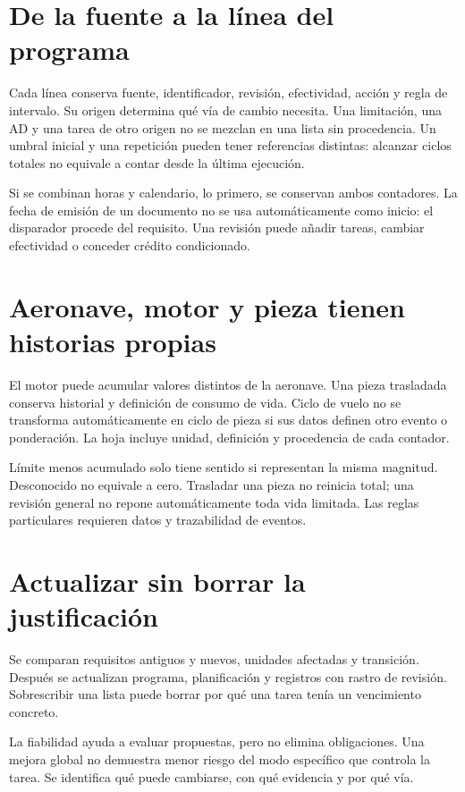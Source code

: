 
\section{De la fuente a la línea del programa}
Cada línea conserva fuente, identificador, revisión, efectividad, acción y regla de intervalo. Su origen determina qué vía de cambio necesita. Una limitación, una AD y una tarea de otro origen no se mezclan en una lista sin procedencia. Un umbral inicial y una repetición pueden tener referencias distintas: alcanzar ciclos totales no equivale a contar desde la última ejecución.

Si se combinan horas y calendario, lo primero, se conservan ambos contadores. La fecha de emisión de un documento no se usa automáticamente como inicio: el disparador procede del requisito. Una revisión puede añadir tareas, cambiar efectividad o conceder crédito condicionado.
\section{Aeronave, motor y pieza tienen historias propias}
El motor puede acumular valores distintos de la aeronave. Una pieza trasladada conserva historial y definición de consumo de vida. Ciclo de vuelo no se transforma automáticamente en ciclo de pieza si sus datos definen otro evento o ponderación. La hoja incluye unidad, definición y procedencia de cada contador.

Límite menos acumulado solo tiene sentido si representan la misma magnitud. Desconocido no equivale a cero. Trasladar una pieza no reinicia total; una revisión general no repone automáticamente toda vida limitada. Las reglas particulares requieren datos y trazabilidad de eventos.
\section{Actualizar sin borrar la justificación}
Se comparan requisitos antiguos y nuevos, unidades afectadas y transición. Después se actualizan programa, planificación y registros con rastro de revisión. Sobrescribir una lista puede borrar por qué una tarea tenía un vencimiento concreto.

La fiabilidad ayuda a evaluar propuestas, pero no elimina obligaciones. Una mejora global no demuestra menor riesgo del modo específico que controla la tarea. Se identifica qué puede cambiarse, con qué evidencia y por qué vía.
